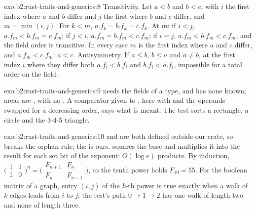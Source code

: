 \begin{solution}{exo:b2:rust-traits-and-generics:8}
Transitivity. Let $a < b$ and $b < c$, with $i$ the first index where $a$ and $b$ differ and $j$ the first where $b$
and $c$ differ, and $m = \min(i, j)$. For $k < m$, $a.f_k = b.f_k = c.f_k$. At $m$: if $i < j$, $a.f_m < b.f_m =
c.f_m$; if $j < i$, $a.f_m = b.f_m < c.f_m$; if $i = j$, $a.f_m < b.f_m < c.f_m$, and the field order is transitive.
In every case $m$ is the first index where $a$ and $c$ differ, and $a.f_m < c.f_m$: $a < c$. Antisymmetry. If $a
\le b$, $b \le a$ and $a \ne b$, at the first index $i$ where they differ both $a.f_i < b.f_i$ and $b.f_i < a.f_i$,
impossible for a total order on the field.
\end{solution}

\begin{solution}{exo:b2:rust-traits-and-generics:9}
 needs the fields of a type, and  has none known; areas are , with no
. A comparator given to , here with  and the operands swapped for a
decreasing order, says what is meant. The test sorts a rectangle, a circle and the 3-4-5 triangle.
\end{solution}

\begin{solution}{exo:b2:rust-traits-and-generics:10}
 and  are both defined outside our crate, so  breaks the orphan rule;
the   is ours.  squares the base and multiplies it into the result for each set
bit of the exponent: $O(\log e)$ products. By induction, $\bigl(\begin{smallmatrix}1&1\\1&0\end{smallmatrix}
\bigr)^n = \bigl(\begin{smallmatrix}F_{n+1}&F_n\\F_n&F_{n-1}\end{smallmatrix}\bigr)$, so the tenth power holds $F_{10}
= 55$. For the boolean matrix of a graph, entry $(i, j)$ of the $k$-th power is true exactly when a walk of $k$
edges leads from $i$ to $j$; the test's path $0 \to 1 \to 2$ has one walk of length two and none of length three.
\end{solution}

